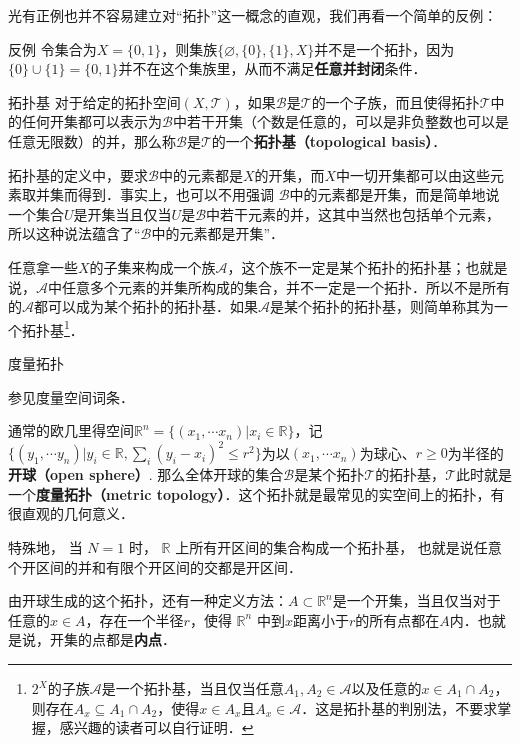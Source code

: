 光有正例也并不容易建立对“拓扑”这一概念的直观，我们再看一个简单的反例：

\begin{example}{反例}
令集合为$X=\{0, 1\}$，则集族$\{\varnothing, \{0\},\{1\}, X\}$并不是一个拓扑，因为$\{0\}\cup\{1\}=\{0,1\}$并不在这个集族里，从而不满足\textbf{任意并封闭}条件．
\end{example}

\begin{definition}{拓扑基}\label{Topol_def2}
对于给定的拓扑空间$(X, \mathcal{T})$，如果$\mathcal{B}$是$\mathcal{T}$的一个子族，而且使得拓扑$\mathcal{T}$中的任何开集都可以表示为$\mathcal{B}$中若干开集（个数是任意的，可以是非负整数也可以是任意无限数）的并，那么称$\mathcal{B}$是$\mathcal{T}$的一个\textbf{拓扑基（topological basis）}．
\end{definition}

拓扑基的定义中，要求$\mathcal{B}$中的元素都是$X$的开集，而$X$中一切开集都可以由这些元素取并集而得到．事实上，也可以不用强调
$\mathcal{B}$中的元素都是开集，而是简单地说一个集合$U$是开集当且仅当$U$是$\mathcal{B}$中若干元素的并，这其中当然也包括单个元素，所以这种说法蕴含了“$\mathcal{B}$中的元素都是开集”．

任意拿一些$X$的子集来构成一个族$\mathcal{A}$，这个族不一定是某个拓扑的拓扑基；也就是说，$\mathcal{A}$中任意多个元素的并集所构成的集合，并不一定是一个拓扑．所以不是所有的$\mathcal{A}$都可以成为某个拓扑的拓扑基．如果$\mathcal{A}$是某个拓扑的拓扑基，则简单称其为一个拓扑基\footnote{$2^X$的子族$\mathcal{A}$是一个拓扑基，当且仅当任意$A_1, A_2\in\mathcal{A}$以及任意的$x\in A_1\cap A_2$，则存在$A_x\subseteq A_1\cap A_2$，使得$x\in A_x$且$A_x\in \mathcal{A}$．这是拓扑基的判别法，不要求掌握，感兴趣的读者可以自行证明．}．


\begin{example}{度量拓扑}

参见度量空间词条．

通常的欧几里得空间$\mathbb{R}^n=\{(x_1, \cdots x_n)|x_i\in \mathbb{R}\}$，记$\{(y_1, \cdots y_n)|y_i\in \mathbb{R}, \sum_i(y_i-x_i)^2\leq r^2\}$为以$(x_1, \cdots x_n)$为球心、$r\geqslant 0$为半径的\textbf{开球（open sphere）}. 那么全体开球的集合$\mathcal{B}$是某个拓扑$\mathcal{T}$的拓扑基，$\mathcal{T}$此时就是一个\textbf{度量拓扑（metric topology）}．这个拓扑就是最常见的实空间上的拓扑，有很直观的几何意义．

特殊地， 当 $N = 1$ 时， $\mathbb R$ 上所有开区间的集合构成一个拓扑基， 也就是说任意个开区间的并和有限个开区间的交都是开区间．

由开球生成的这个拓扑，还有一种定义方法：$A\subset \mathbb{R}^n$是一个开集，当且仅当对于任意的$x\in A$，存在一个半径$r$，使得 $\mathbb R^n$ 中到$x$距离小于$r$的所有点都在$A$内．也就是说，开集的点都是\textbf{内点}．
\end{example}

